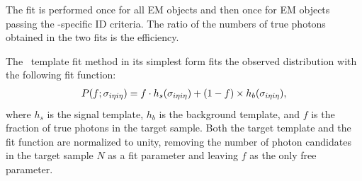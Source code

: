 The fit is performed once for all EM objects and then once for EM objects passing the \Pgg-specific ID criteria. 
The ratio of the numbers of true photons obtained in the two fits is the efficiency.

The \sieie\ template fit method in its simplest form fits the observed distribution with the following fit function:
\begin{align}
  P(f;\sigma_{i\eta i\eta}) = f \cdot h_{s}(\sigma_{i\eta i\eta}) + (1 - f) \times h_{b}(\sigma_{i\eta i\eta}),
\end{align}
where $h_{s}$ is the signal template, $h_{b}$ is the background template, and $f$ is the fraction of true photons in the target sample. 
Both the target template and the fit function are normalized to unity, removing the number of photon candidates in the target sample $N$ as a fit parameter and leaving $f$ as the only free parameter.

